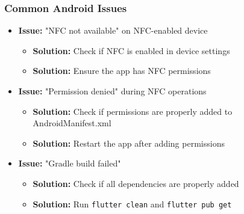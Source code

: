 \documentclass[a4paper,12pt]{article}
\begin{document}
\subsubsection{Common Android Issues}
\begin{itemize}
    \item \textbf{Issue:} "NFC not available" on NFC-enabled device
    \begin{itemize}
        \item \textbf{Solution:} Check if NFC is enabled in device settings
        \item \textbf{Solution:} Ensure the app has NFC permissions
    \end{itemize}
    
    \item \textbf{Issue:} "Permission denied" during NFC operations
    \begin{itemize}
        \item \textbf{Solution:} Check if permissions are properly added to AndroidManifest.xml
        \item \textbf{Solution:} Restart the app after adding permissions
    \end{itemize}
    
    \item \textbf{Issue:} "Gradle build failed"
    \begin{itemize}
        \item \textbf{Solution:} Check if all dependencies are properly added
        \item \textbf{Solution:} Run \texttt{flutter clean} and \texttt{flutter pub get}
    \end{itemize}
\end{itemize}
\end{document}

